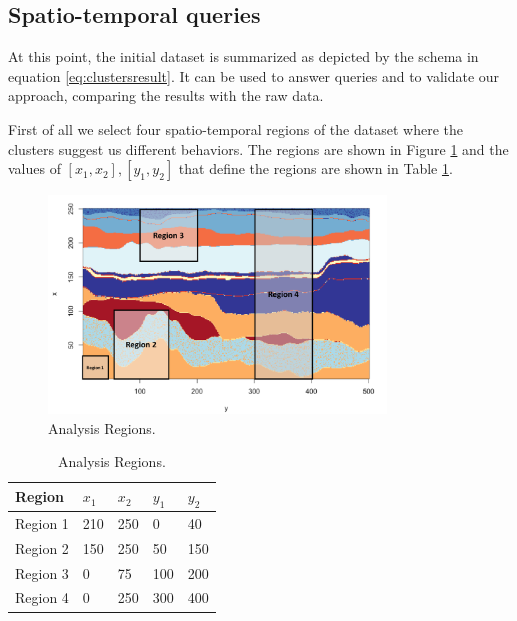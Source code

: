 \subsection{Spatio-temporal queries}\label{spatio_temporal_queries}
At this point, the initial dataset is summarized as depicted by the schema in equation \ref{eq:clustersresult}. It can be used to answer queries and to validate our approach, comparing the results with the raw data.

First of all we select four spatio-temporal regions of the dataset where the clusters suggest us different behaviors. The regions are shown in Figure \ref{fig:analysis_regions} and the values of $[x_{1}, x_{2}], [y_{1}, y_{2}]$ that define the regions are shown in Table \ref{tab:analysis_regions}. 

\begin{figure}[H]
    \centering
    \includegraphics[width=0.8\textwidth]{images/regions.png}
    \caption{Analysis Regions.}
    \label{fig:analysis_regions}
\end{figure}

\begin{table}
\begin{center}
    \begin{tabular}{|l|l|l|l|l|}
    \hline
    \textbf{Region} & $x_{1}$ & $x_{2}$ & $y_{1}$ & $y_{2}$        \\ \hline
    Region 1     & 210 & 250 & 0 & 40              \\ \hline
    Region 2     & 150 & 250 & 50 & 150           \\ \hline
    Region 3     & 0 & 75 & 100 & 200            \\ \hline
    Region 4     & 0 & 250 & 300 & 400               \\ \hline
    \end{tabular}
    \caption {Analysis Regions.}
    \label{tab:analysis_regions}
    \end{center}
\end{table}

